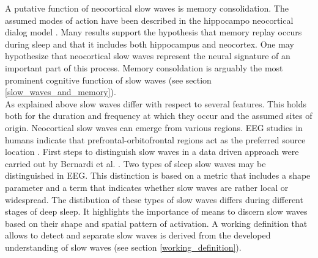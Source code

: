 A putative function of neocortical slow waves is memory consolidation. The assumed modes of action have been described in the hippocampo neocortical dialog model \parencite{buzsaki1996hippocampo}. Many results support the hypothesis that memory replay occurs during sleep and that it includes both hippocampus and neocortex. One may hypothesize that neocortical slow waves represent the neural signature of an important part of this process. Memory consoldation is arguably the most prominent cognitive function of slow waves (see section \ref{slow_waves_and_memory}).\\
As explained above slow waves differ with respect to several features. This holds both for the duration and frequency at which they occur and the assumed sites of origin. Neocortical slow waves can emerge from various regions. EEG studies in humans indicate that prefrontal-orbitofrontal regions act as the preferred source location \parencite[p. 1110]{brown2012control}. First steps to distinguish slow waves in a data driven approach were carried out by Bernardi et al. \parencite*{bernardi2018local}. Two types of sleep slow waves may be distinguished in EEG. This distinction is based on a metric that includes a shape parameter and a term that indicates whether slow waves are rather local or widespread. The distibution of these types of slow waves differs during different stages of deep sleep. It highlights the importance of means to discern slow waves based on their shape and spatial pattern of activation. A working definition that allows to detect and separate slow waves is derived from the developed understanding of slow waves (see section \ref{working_definition}).


